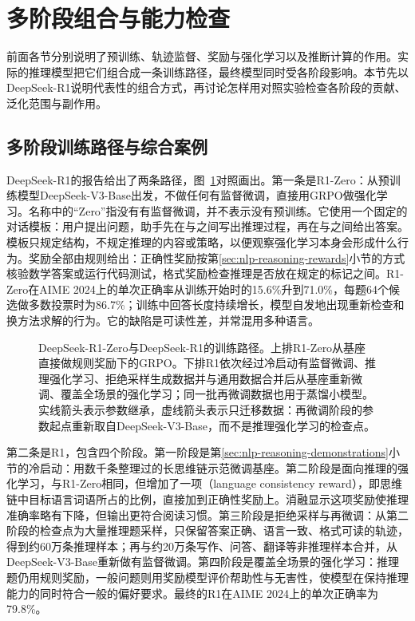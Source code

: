 \section{多阶段组合与能力检查}
\label{sec:nlp-reasoning-integration}

前面各节分别说明了预训练、轨迹监督、奖励与强化学习以及推断计算的作用。实际的推理模型把它们组合成一条训练路径，最终模型同时受各阶段影响。本节先以DeepSeek-R1说明代表性的组合方式，再讨论怎样用对照实验检查各阶段的贡献、泛化范围与副作用。

\subsection{多阶段训练路径与综合案例}
\label{sec:nlp-reasoning-r1-pipeline}

DeepSeek-R1的报告给出了两条路径，图~\ref{fig:nlp-reasoning-r1-pipeline}对照画出。第一条是R1-Zero：从预训练模型DeepSeek-V3-Base出发，不做任何有监督微调，直接用GRPO做强化学习。名称中的“Zero”指没有有监督微调，并不表示没有预训练。它使用一个固定的对话模板：用户提出问题，助手先在与之间写出推理过程，再在与之间给出答案。模板只规定结构，不规定推理的内容或策略，以便观察强化学习本身会形成什么行为。奖励全部由规则给出：正确性奖励按第\ref{sec:nlp-reasoning-rewards}小节的方式核验数学答案或运行代码测试，格式奖励检查推理是否放在规定的标记之间。R1-Zero在AIME 2024上的单次正确率从训练开始时的15.6\%升到71.0\%，每题64个候选做多数投票时为86.7\%；训练中回答长度持续增长，模型自发地出现重新检查和换方法求解的行为。它的缺陷是可读性差，并常混用多种语言。

\begin{figure}[!t]
  \centering
  
  \caption{DeepSeek-R1-Zero与DeepSeek-R1的训练路径。上排R1-Zero从基座直接做规则奖励下的GRPO。下排R1依次经过冷启动有监督微调、推理强化学习、拒绝采样生成数据并与通用数据合并后从基座重新微调、覆盖全场景的强化学习；同一批再微调数据也用于蒸馏小模型。实线箭头表示参数继承，虚线箭头表示只迁移数据：再微调阶段的参数起点重新取自DeepSeek-V3-Base，而不是推理强化学习的检查点。}
  \label{fig:nlp-reasoning-r1-pipeline}
\end{figure}

第二条是R1，包含四个阶段。第一阶段是第\ref{sec:nlp-reasoning-demonstrations}小节的冷启动：用数千条整理过的长思维链示范微调基座。第二阶段是面向推理的强化学习，与R1-Zero相同，但增加了一项（language consistency reward），即思维链中目标语言词语所占的比例，直接加到正确性奖励上。消融显示这项奖励使推理准确率略有下降，但输出更符合阅读习惯。第三阶段是拒绝采样与再微调：从第二阶段的检查点为大量推理题采样，只保留答案正确、语言一致、格式可读的轨迹，得到约60万条推理样本；再与约20万条写作、问答、翻译等非推理样本合并，从DeepSeek-V3-Base重新做有监督微调。第四阶段是覆盖全场景的强化学习：推理题仍用规则奖励，一般问题则用奖励模型评价帮助性与无害性，使模型在保持推理能力的同时符合一般的偏好要求。最终的R1在AIME 2024上的单次正确率为79.8\%。

